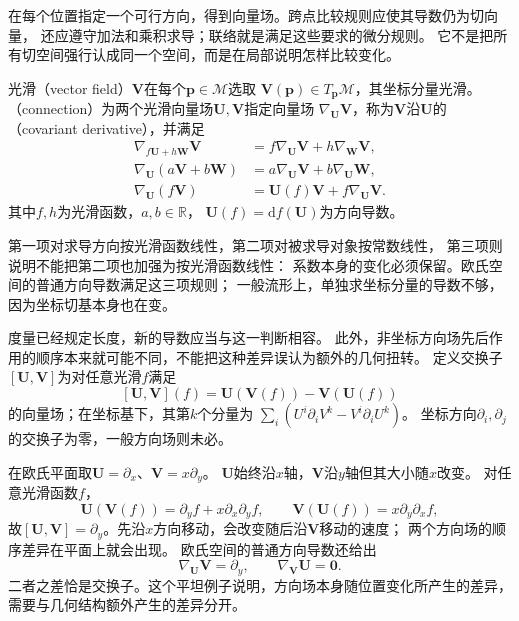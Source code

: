在每个位置指定一个可行方向，得到向量场。跨点比较规则应使其导数仍为切向量，
还应遵守加法和乘积求导；联络就是满足这些要求的微分规则。
它不是把所有切空间强行认成同一个空间，而是在局部说明怎样比较变化。

\begin{definition}[向量场与联络]
\label{def:geometry-connection}
光滑（vector field）$\bm V$在每个$\bm p\in\mathcal M$选取
$\bm V(\bm p)\in T_{\bm p}\mathcal M$，其坐标分量光滑。
（connection）为两个光滑向量场$\bm U,\bm V$指定向量场
$\nabla_{\bm U}\bm V$，称为$\bm V$沿$\bm U$的
（covariant derivative），并满足
\[
 \begin{aligned}
 \nabla_{f\bm U+h\bm W}\bm V
   &=f\nabla_{\bm U}\bm V+h\nabla_{\bm W}\bm V,\\
 \nabla_{\bm U}(a\bm V+b\bm W)
   &=a\nabla_{\bm U}\bm V+b\nabla_{\bm U}\bm W,\\
 \nabla_{\bm U}(f\bm V)
   &=\bm U(f)\bm V+f\nabla_{\bm U}\bm V.
 \end{aligned}
\]
其中$f,h$为光滑函数，$a,b\in\mathbb R$，
$\bm U(f)=\mathrm df(\bm U)$为方向导数。
\end{definition}
第一项对求导方向按光滑函数线性，第二项对被求导对象按常数线性，
第三项则说明不能把第二项也加强为按光滑函数线性：
系数本身的变化必须保留。欧氏空间的普通方向导数满足这三项规则；
一般流形上，单独求坐标分量的导数不够，因为坐标切基本身也在变。

度量已经规定长度，新的导数应当与这一判断相容。
此外，非坐标方向场先后作用的顺序本来就可能不同，不能把这种差异误认为额外的几何扭转。
定义交换子$[\bm U,\bm V]$为对任意光滑$f$满足
\[
 [\bm U,\bm V](f)=\bm U(\bm V(f))-\bm V(\bm U(f))
\]
的向量场；在坐标基下，其第$k$个分量为
$\sum_i(U^i\partial_iV^k-V^i\partial_iU^k)$。
坐标方向$\partial_i,\partial_j$的交换子为零，一般方向场则未必。

\begin{example}[平面上不可交换的方向场]
\label{ex:geometry-plane-field-commutator}
在欧氏平面取$\bm U=\partial_x$、$\bm V=x\partial_y$。
$\bm U$始终沿$x$轴，$\bm V$沿$y$轴但其大小随$x$改变。
对任意光滑函数$f$，
\[
 \bm U(\bm V(f))=\partial_yf+x\partial_x\partial_yf,\qquad
 \bm V(\bm U(f))=x\partial_y\partial_xf,
\]
故$[\bm U,\bm V]=\partial_y$。先沿$x$方向移动，会改变随后沿$\bm V$移动的速度；
两个方向场的顺序差异在平面上就会出现。
欧氏空间的普通方向导数还给出
\[
 \nabla_{\bm U}\bm V=\partial_y,\qquad
 \nabla_{\bm V}\bm U=\bm0.
\]
二者之差恰是交换子。这个平坦例子说明，方向场本身随位置变化所产生的差异，
需要与几何结构额外产生的差异分开。
\end{example}

